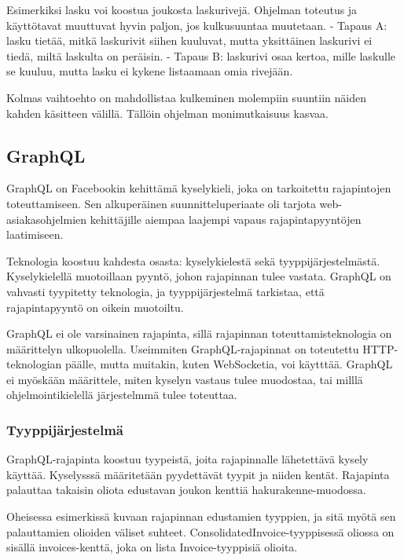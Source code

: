 Esimerkiksi lasku voi koostua joukosta laskurivejä. Ohjelman toteutus ja
käyttötavat muuttuvat hyvin paljon, jos kulkusuuntaa muutetaan. - Tapaus
A: lasku tietää, mitkä laskurivit siihen kuuluvat, mutta yksittäinen
laskurivi ei tiedä, miltä laskulta on peräisin. - Tapaus B: laskurivi
osaa kertoa, mille laskulle se kuuluu, mutta lasku ei kykene listaamaan
omia rivejään.

Kolmas vaihtoehto on mahdollistaa kulkeminen molempiin suuntiin näiden
kahden käsitteen välillä. Tällöin ohjelman monimutkaisuus kasvaa.

\hypertarget{graphql}{%
\subsection{GraphQL}\label{graphql}}

GraphQL on Facebookin kehittämä kyselykieli, joka on tarkoitettu
rajapintojen toteuttamiseen. Sen alkuperäinen suunnitteluperiaate oli
tarjota web-asiakasohjelmien kehittäjille aiempaa laajempi vapaus
rajapintapyyntöjen laatimiseen. \cite{graphql:spec}

Teknologia koostuu kahdesta osasta: kyselykielestä sekä
tyyppijärjestelmästä. Kyselykielellä muotoillaan pyyntö, johon
rajapinnan tulee vastata. GraphQL on vahvasti tyypitetty teknologia, ja
tyyppijärjestelmä tarkistaa, että rajapintapyyntö on oikein muotoiltu.

GraphQL ei ole varsinainen rajapinta, sillä rajapinnan
toteuttamisteknologia on määrittelyn ulkopuolella. Useimmiten
GraphQL-rajapinnat on toteutettu HTTP-teknologian päälle, mutta
muitakin, kuten WebSocketia, voi käytttää. GraphQL ei myöskään
määrittele, miten kyselyn vastaus tulee muodostaa, tai milllä
ohjelmointikielellä järjestelmmä tulee toteuttaa.

\hypertarget{tyyppijuxe4rjestelmuxe4}{%
\subsubsection{Tyyppijärjestelmä}\label{tyyppijuxe4rjestelmuxe4}}

GraphQL-rajapinta koostuu tyypeistä, joita rajapinnalle lähetettävä
kysely käyttää. Kyselysssä määritetään pyydettävät tyypit ja niiden
kentät. Rajapinta palauttaa takaisin oliota edustavan joukon kenttiä
\gls{hakurakenne}-muodossa. \cite{graphql:spec}

Oheisessa esimerkissä kuvaan rajapinnan edustamien tyyppien, ja sitä
myötä sen palauttamien olioiden väliset suhteet.
ConsolidatedInvoice-tyyppisessä oliossa on sisällä invoices-kenttä, joka
on lista Invoice-tyyppisiä olioita.

